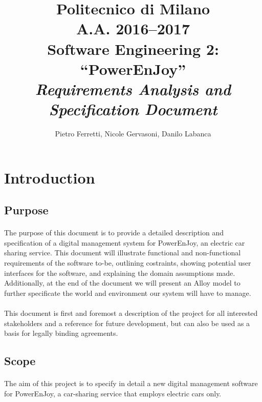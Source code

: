 \documentclass[english]{article}
\begin{document}
\title{Politecnico di Milano\\
 A.A. 2016–2017 \\
Software Engineering 2: “PowerEnJoy” \\
\emph{Requirements Analysis and Specification Document}}

\author{Pietro Ferretti, Nicole Gervasoni, Danilo Labanca}

\maketitle
\newpage{}

\tableofcontents{}

\newpage{}

\section{Introduction}

\subsection{Purpose}

\paragraph{}
The purpose of this document is to provide a detailed description and specification of a digital management system for PowerEnJoy, an electric car sharing service. This document will 
illustrate functional and non-functional requirements of the software to-be, outlining costraints, showing potential user interfaces for the software, and explaining the domain assumptions made. Additionally, at the end of the document we will present an Alloy model to further specificate the world and environment our system will have to manage.

\paragraph{}
This document is first and foremost a description of the project for all interested stakeholders and a reference for future development, but can also be used as a basis for legally binding agreements. 


\subsection{Scope}

\paragraph{}
The aim of this project is to specify in detail a new digital management software for PowerEnJoy, a car-sharing service that employs electric cars only.
\end{document}

